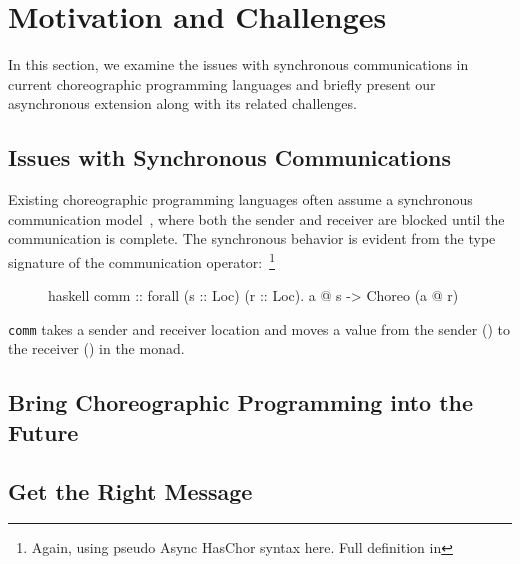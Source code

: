 \section{Motivation and Challenges}
\label{sec:motiv}

In this section, we examine the issues with synchronous communications in current choreographic programming languages and briefly present our asynchronous extension along with its related challenges.

\subsection{Issues with Synchronous Communications}

Existing choreographic programming languages often assume a synchronous communication model~\citep{pirouette, choral, chor-lambda}, where both the sender and receiver are blocked until the communication is complete.
%
The synchronous behavior is evident from the type signature of the communication operator:~\footnote{Again, using pseudo Async HasChor syntax here. Full definition in }

\begin{figure}[h]
\begin{cminted}{haskell}
comm :: forall (s :: Loc) (r :: Loc). a @ s -> Choreo (a @ r)
\end{cminted}
\end{figure}

\noindent \texttt{comm} takes a sender and receiver location and moves a value from the sender () to the receiver () in the  monad.
%


\subsection{Bring Choreographic Programming into the Future}

\subsection{Get the Right Message}
